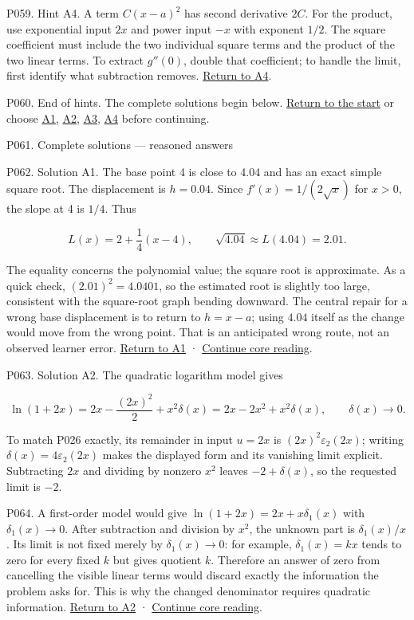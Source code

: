 \documentclass[
  11pt,
]{article}
\providecommand{\gt}{>}
\begin{document}
P059. Hint A4. A term \(C(x-a)^2\) has second derivative \(2C\). For the
product, use exponential input \(2x\) and power input \(-x\) with
exponent \(1/2\). The square coefficient must include the two individual
square terms and the product of the two linear terms. To extract
\(g''(0)\), double that coefficient; to handle the limit, first identify
what subtraction removes. \protect\hyperlink{a4}{Return to A4}.

P060. End of hints. The complete solutions begin below.
\protect\hyperlink{start}{Return to the start} or choose
\protect\hyperlink{a1}{A1}, \protect\hyperlink{a2}{A2},
\protect\hyperlink{a3}{A3}, \protect\hyperlink{a4}{A4} before
continuing.

P061. Complete solutions --- reasoned answers

P062. Solution A1. The base point 4 is close to 4.04 and has an exact
simple square root. The displacement is \(h=0.04\). Since
\(f'(x)=1/(2\sqrt{x})\) for \(x\gt 0\), the slope at 4 is \(1/4\). Thus

\[
L(x)=2+\frac14(x-4),\qquad \sqrt{4.04}\approx L(4.04)=2.01.
\]

The equality concerns the polynomial value; the square root is
approximate. As a quick check, \((2.01)^2=4.0401\), so the estimated
root is slightly too large, consistent with the square-root graph
bending downward. The central repair for a wrong base displacement is to
return to \(h=x-a\); using \(4.04\) itself as the change would move from
the wrong point. That is an anticipated wrong route, not an observed
learner error. \protect\hyperlink{a1}{Return to A1} ·
\protect\hyperlink{after-a1}{Continue core reading}.

P063. Solution A2. The quadratic logarithm model gives

\[
\ln(1+2x)=2x-\frac{(2x)^2}{2}+x^2\delta(x)
=2x-2x^2+x^2\delta(x),\qquad \delta(x)\to0.
\]

To match P026 exactly, its remainder in input \(u=2x\) is
\((2x)^2\varepsilon_2(2x)\); writing \(\delta(x)=4\varepsilon_2(2x)\)
makes the displayed form and its vanishing limit explicit. Subtracting
\(2x\) and dividing by nonzero \(x^2\) leaves \(-2+\delta(x)\), so the
requested limit is \(-2\).

P064. A first-order model would give \(\ln(1+2x)=2x+x\delta_1(x)\) with
\(\delta_1(x)\to0\). After subtraction and division by \(x^2\), the
unknown part is \(\delta_1(x)/x\). Its limit is not fixed merely by
\(\delta_1(x)\to0\): for example, \(\delta_1(x)=kx\) tends to zero for
every fixed \(k\) but gives quotient \(k\). Therefore an answer of zero
from cancelling the visible linear terms would discard exactly the
information the problem asks for. This is why the changed denominator
requires quadratic information. \protect\hyperlink{a2}{Return to A2} ·
\protect\hyperlink{after-a2}{Continue core reading}.
\end{document}

